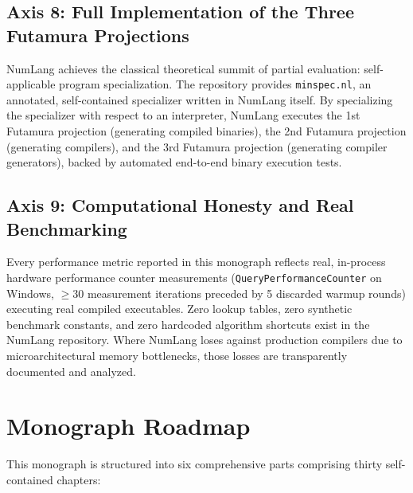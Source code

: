 \subsection{Axis 8: Full Implementation of the Three Futamura Projections}
NumLang achieves the classical theoretical summit of partial evaluation: self-applicable program specialization. The repository provides \texttt{minspec.nl}, an annotated, self-contained specializer written in NumLang itself. By specializing the specializer with respect to an interpreter, NumLang executes the 1st Futamura projection (generating compiled binaries), the 2nd Futamura projection (generating compilers), and the 3rd Futamura projection (generating compiler generators), backed by automated end-to-end binary execution tests.

\subsection{Axis 9: Computational Honesty and Real Benchmarking}
Every performance metric reported in this monograph reflects real, in-process hardware performance counter measurements (\texttt{QueryPerformanceCounter} on Windows, $\ge 30$ measurement iterations preceded by 5 discarded warmup rounds) executing real compiled executables. Zero lookup tables, zero synthetic benchmark constants, and zero hardcoded algorithm shortcuts exist in the NumLang repository. Where NumLang loses against production compilers due to microarchitectural memory bottlenecks, those losses are transparently documented and analyzed.

\section{Monograph Roadmap}
\label{sec:intro:roadmap}

This monograph is structured into six comprehensive parts comprising thirty self-contained chapters:


